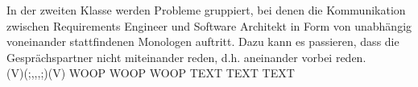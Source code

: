 In der zweiten Klasse werden Probleme gruppiert, bei denen die Kommunikation zwischen Requirements Engineer und Software Architekt in Form von unabhängig voneinander stattfindenen Monologen auftritt. Dazu kann es passieren, dass die Gesprächspartner nicht miteinander reden, d.h. aneinander vorbei reden. \\

(V)(;,,,;)(V) WOOP WOOP WOOP TEXT TEXT TEXT